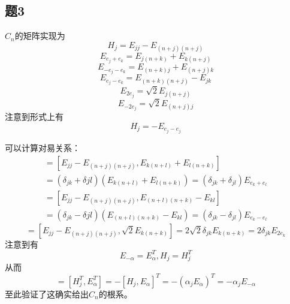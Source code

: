 \documentclass{ctexart}
\begin{document}
	\subsection{题3}
	
	$C_n$的矩阵实现为
	\begin{equation}
	H_j=E_{jj}-E_{(n+j)(n+j)}
	\end{equation}
	\begin{equation}
	E_{e_j+e_k}=E_{j(n+k)}+E_{k(n+j)}
	\end{equation}
	\begin{equation}
	E_{-e_j-e_k}=E_{(n+k)j}+E_{(n+j)k}
	\end{equation}
	\begin{equation}
	E_{e_j-e_k}=E_{(n+k)(n+j)}-E_{jk}
	\end{equation}
	\begin{equation}
	E_{2e_j}=\sqrt{2}E_{j(n+j)}
	\end{equation}
	\begin{equation}
	E_{-2e_j}=\sqrt{2}E_{(n+j)j}
	\end{equation}
	注意到形式上有
	\begin{equation}
	H_j=-E_{e_j-e_j}
	\end{equation}
	
	可以计算对易关系：
	\begin{multline}
	[H_j,E_{e_k+e_l}]=[E_{jj}-E_{(n+j)(n+j)},E_{k(n+l)}+E_{l(n+k)}]\\=(\delta_{jk}+\delta{jl})(E_{k(n+l)}+E_{l(n+k)})=(\delta_{jk}+\delta_{jl})E_{e_k+e_l}
	\end{multline}
	\begin{multline}
	[H_j,E_{e_k-e_l}]=[E_{jj}-E_{(n+j)(n+j)},E_{(n+l)(n+k)}-E_{kl}]\\=(\delta_{jk}-\delta{jl})(E_{(n+l)(n+k)}-E_{kl})=(\delta_{jk}-\delta_{jl})E_{e_k-e_l}
	\end{multline}
	\begin{equation}
	[H_j,E_{2e_k}]=[E_{jj}-E_{(n+j)(n+j)},\sqrt{2}E_{k(n+k)}]=2\sqrt 2\delta_{jk}E_{k(n+k)}=2\delta_{jk}E_{2e_k}
	\end{equation}
	注意到有
	\begin{equation}
	E_{-\alpha}=E_{\alpha}^T,H_j=H_j^T
	\end{equation}
	从而
	\begin{equation}
	[H_j,E_{-\alpha}]=[H_j^T,E_{\alpha}^T]=-[H_j,E_\alpha]^T=-(\alpha_jE_\alpha)^T=-\alpha_jE_{-\alpha}
	\end{equation}
	至此验证了这确实给出$C_n$的根系。
	
\end{document}
